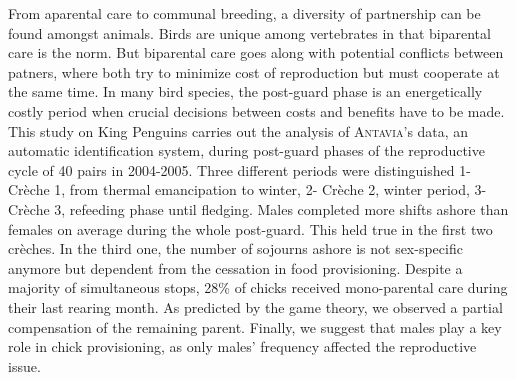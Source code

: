 \begin{singlespace}
From aparental care to communal breeding, a diversity of partnership can be found amongst animals. Birds are unique among vertebrates in that biparental care is the norm. But biparental care goes along with potential conflicts between patners, where both try to minimize cost of reproduction but must cooperate at the same time. In many bird species, the post-guard phase is an energetically costly period when crucial decisions between costs and benefits have to be made.  
This study on King Penguins carries out the analysis of \textsc{Antavia}'s data, an automatic identification system, during post-guard phases of the reproductive cycle of 40 pairs in 2004-2005. Three different periods were distinguished 1\-- Crèche 1, from thermal emancipation to winter, 2\-- Crèche 2, winter period, 3\-- Crèche 3, refeeding phase until fledging.
Males completed more shifts ashore than females on average during the whole post-guard. This held true in the first two crèches. In the third one, the number of sojourns ashore is not sex-specific anymore but dependent from the cessation in food provisioning. Despite a majority of simultaneous stops, 28\% of chicks received mono-parental care during their last rearing month.  As predicted by the game theory, we observed a partial compensation of the remaining parent. Finally, we suggest that males play a key role in chick provisioning, as only males’ frequency affected the reproductive issue. 

\end{singlespace}